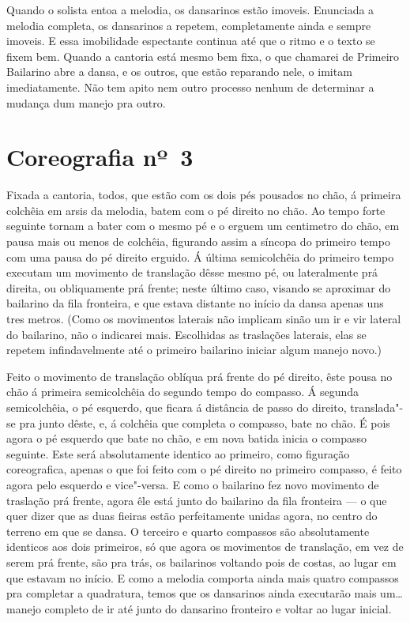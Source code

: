 Quando o solista entoa a melodia, os dansarinos estão imoveis. Enunciada
a melodia completa, os dansarinos a repetem, completamente ainda e
sempre imoveis. E essa imobilidade espectante continua até que o ritmo e
o texto se fixem bem. Quando a cantoria está mesmo bem fixa, o que
chamarei de Primeiro Bailarino abre a dansa, e os outros, que estão
reparando nele, o imitam imediatamente. Não tem apito nem outro processo
nenhum de determinar a mudança dum manejo pra outro.

\section*{Coreografia nº~3}

Fixada a cantoria, todos, que estão com os dois pés pousados no chão, á
primeira colchêia em arsis da melodia, batem com o pé direito no chão.
Ao tempo forte seguinte tornam a bater com o mesmo pé e o erguem um
centimetro do chão, em pausa mais ou menos de colchêia, figurando assim
a síncopa do primeiro tempo com uma pausa do pé direito erguido. Á
última semicolchêia do primeiro tempo executam um movimento de
translação dêsse mesmo pé, ou lateralmente prá direita, ou obliquamente
prá frente; neste último caso, visando se aproximar do bailarino da fila
fronteira, e que estava distante no início da dansa apenas uns tres
metros. (Como os movimentos laterais não implicam sinão um ir e vir
lateral do bailarino, não o indicarei mais. Escolhidas as traslações
laterais, elas se repetem infindavelmente até o primeiro bailarino
iniciar algum manejo novo.)

Feito o movimento de translação oblíqua prá frente do pé direito, êste
pousa no chão á primeira semicolchêia do segundo tempo do compasso. Á
segunda semicolchêia, o pé esquerdo, que ficara á distância de passo do
direito, translada"-se pra junto dêste, e, á colchêia que completa o
compasso, bate no chão. É pois agora o pé esquerdo que bate no chão, e
em nova batida inicia o compasso seguinte. Este será absolutamente
identico ao primeiro, como figuração coreografica, apenas o que foi
feito com o pé direito no primeiro compasso, é feito agora pelo esquerdo
e vice"-versa. E como o bailarino fez novo movimento de traslação prá
frente, agora êle está junto do bailarino da fila fronteira --- o que
quer dizer que as duas fieiras estão perfeitamente unidas agora, no
centro do terreno em que se dansa. O terceiro e quarto compassos são
absolutamente identicos aos dois primeiros, só que agora os movimentos
de translação, em vez de serem prá frente, são pra trás, os bailarinos
voltando pois de costas, ao lugar em que estavam no início. E como a
melodia comporta ainda mais quatro compassos pra completar a quadratura,
temos que os dansarinos ainda executarão mais um\ldots{} manejo completo de
ir até junto do dansarino fronteiro e voltar ao lugar inicial.

